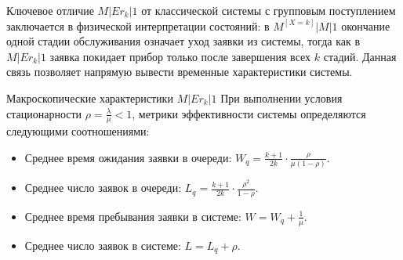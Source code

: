 Ключевое отличие $M|Er_k|1$ от классической системы с групповым поступлением заключается в физической интерпретации состояний: в $M^{[X=k]}|M|1$ окончание одной стадии обслуживания означает уход заявки из системы, тогда как в $M|Er_k|1$ заявка покидает прибор только после завершения всех $k$ стадий. Данная связь позволяет напрямую вывести временные характеристики системы.

\begin{theorem}{Макроскопические характеристики $M|Er_k|1$}
При выполнении условия стационарности $\rho = \frac{\lambda}{\mu} < 1$, метрики эффективности системы определяются следующими соотношениями:
\begin{itemize}
    \item Среднее время ожидания заявки в очереди: $\displaystyle W_q = \frac{k+1}{2k} \cdot \frac{\rho}{\mu(1 - \rho)}$.
    \item Среднее число заявок в очереди: $\displaystyle L_q = \frac{k+1}{2k} \cdot \frac{\rho^2}{1 - \rho}$.
    \item Среднее время пребывания заявки в системе: $\displaystyle W = W_q + \frac{1}{\mu}$.
    \item Среднее число заявок в системе: $\displaystyle L = L_q + \rho$.
\end{itemize}
\end{theorem}


